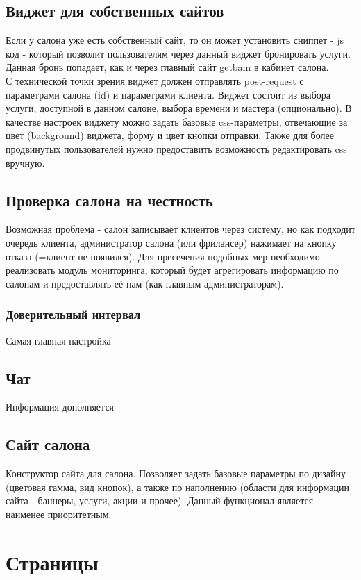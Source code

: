 \documentclass[DIV=calc, paper=a4, fontsize=11pt]{scrartcl} %
\begin{document}
\subsection{Виджет для собственных сайтов} \label{subsection:widget}
Если у салона уже есть собственный сайт, то он может установить сниппет - js код - который позволит пользователям через данный виджет бронировать услуги. Данная бронь попадает, как и через главный сайт getbam в кабинет салона.
\\[0.5cm]
С технической точки зрения виджет должен отправлять post-request с параметрами салона (id) и параметрами клиента. 
Виджет состоит из выбора услуги, доступной в данном салоне, выбора времени и мастера (опционально).
В качестве настроек виджету можно задать базовые css-параметры, отвечающие за цвет (background) виджета, форму и цвет кнопки отправки. Также для более продвинутых пользователей нужно предоставить возможность редактировать css вручную.

\subsection{Проверка салона на честность}
Возможная проблема - салон записывает клиентов через систему, но как подходит очередь клиента, администратор салона (или фрилансер) нажимает на кнопку отказа (=клиент не появился). Для пресечения подобных мер необходимо реализовать модуль мониторинга, который будет агрегировать информацию по салонам и предоставлять её нам (как главным администраторам).

\subsubsection{Доверительный интервал}
Самая главная настройка 

\subsection{Чат}
Информация дополняется

\subsection{Сайт салона}
Конструктор сайта для салона. Позволяет задать базовые параметры по дизайну (цветовая гамма, вид кнопок), а также по наполнению (области для информации сайта - баннеры, услуги, акции и прочее). Данный функционал является наименее приоритетным.

\section{Страницы}
\end{document}
